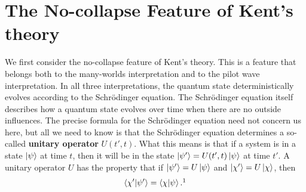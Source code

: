 

\section{The No-collapse Feature of Kent's theory}
We first consider the no-collapse feature of Kent's theory. This is a feature that belongs both to the many-worlds interpretation and to the pilot wave interpretation. In all three interpretations, the quantum state deterministically evolves according to the Schr\"{o}dinger equation. The Schr\"{o}dinger equation itself describes how a quantum state evolves over time when there are no outside influences. The precise formula for the Schr\"{o}dinger equation need not concern us here, but all we need to know is that the Schr\"{o}dinger equation determines a so-called \textbf{unitary operator} $U(t',t)$. What this means is that if a system is in a state $\ket{\psi}$ at time $t$, then it will be in the state $\ket{\psi'}=U(t',t)\ket{\psi}$
at time $t'$. A unitary operator $U$ has the property that if $\ket{\psi'}=U\ket{\psi}$ and $\ket{\chi'}=U\ket{\chi}$, then 
\begin{equation}\label{unitarycond}
\ip{\chi'}{\psi'}=\ip{\chi}{\psi}.\protect\footnotemark
\end{equation}
